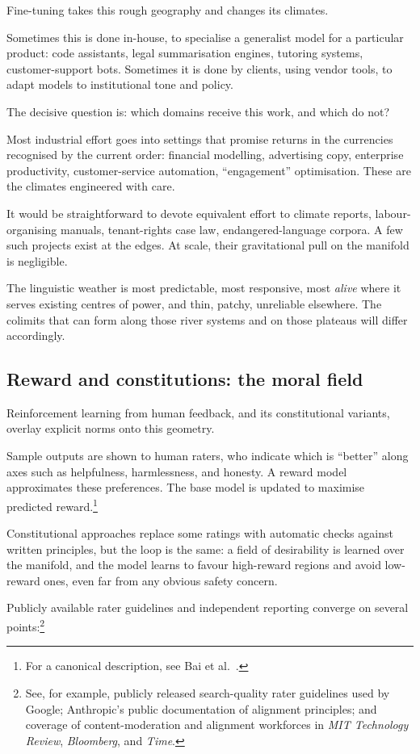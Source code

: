 Fine-tuning takes this rough geography and changes its climates.

Sometimes this is done in-house, to specialise a generalist model for a particular product: code assistants, legal summarisation engines, tutoring systems, customer-support bots. Sometimes it is done by clients, using vendor tools, to adapt models to institutional tone and policy.

The decisive question is: which domains receive this work, and which do not?

Most industrial effort goes into settings that promise returns in the currencies recognised by the current order: financial modelling, advertising copy, enterprise productivity, customer-service automation, ``engagement'' optimisation. These are the climates engineered with care.

It would be straightforward to devote equivalent effort to climate reports, labour-organising manuals, tenant-rights case law, endangered-language corpora. A few such projects exist at the edges. At scale, their gravitational pull on the manifold is negligible.

The linguistic weather is most predictable, most responsive, most \emph{alive} where it serves existing centres of power, and thin, patchy, unreliable elsewhere. The colimits that can form along those river systems and on those plateaus will differ accordingly.

\subsection{Reward and constitutions: the moral field}

Reinforcement learning from human feedback, and its constitutional variants, overlay explicit norms onto this geometry.

Sample outputs are shown to human raters, who indicate which is ``better'' along axes such as helpfulness, harmlessness, and honesty. A reward model approximates these preferences. The base model is updated to maximise predicted reward.\footnote{For a canonical description, see Bai et al.\ \cite{bai2022constitutional}.}

Constitutional approaches replace some ratings with automatic checks against written principles, but the loop is the same: a field of desirability is learned over the manifold, and the model learns to favour high-reward regions and avoid low-reward ones, even far from any obvious safety concern.

Publicly available rater guidelines and independent reporting converge on several points:\footnote{See, for example, publicly released search-quality rater guidelines used by Google; Anthropic's public documentation of alignment principles; and coverage of content-moderation and alignment workforces in \emph{MIT Technology Review}, \emph{Bloomberg}, and \emph{Time}.}

